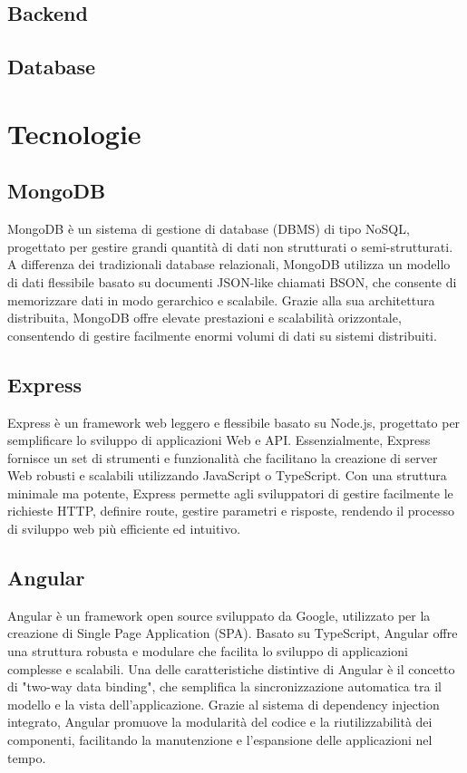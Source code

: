 \documentclass[12pt,a4paper,openright,twoside]{book}
\begin{document}
\section{Backend}

\section{Database}


\chapter{Tecnologie}

\section{MongoDB}

MongoDB è un sistema di gestione di database (DBMS) di tipo NoSQL, progettato per gestire grandi quantità di dati non strutturati o semi-strutturati. A differenza dei tradizionali database relazionali, MongoDB utilizza un modello di dati flessibile basato su documenti JSON-like chiamati BSON, che consente di memorizzare dati in modo gerarchico e scalabile. Grazie alla sua architettura distribuita, MongoDB offre elevate prestazioni e scalabilità orizzontale, consentendo di gestire facilmente enormi volumi di dati su sistemi distribuiti.

\section{Express}

Express è un framework web leggero e flessibile basato su Node.js, progettato per semplificare lo sviluppo di applicazioni Web e API. Essenzialmente, Express fornisce un set di strumenti e funzionalità che facilitano la creazione di server Web robusti e scalabili utilizzando JavaScript o TypeScript. Con una struttura minimale ma potente, Express permette agli sviluppatori di gestire facilmente le richieste HTTP, definire route, gestire parametri e risposte, rendendo il processo di sviluppo web più efficiente ed intuitivo.

\section{Angular}

Angular è un framework open source sviluppato da Google, utilizzato per la creazione di Single Page Application (SPA). Basato su TypeScript, Angular offre una struttura robusta e modulare che facilita lo sviluppo di applicazioni complesse e scalabili. Una delle caratteristiche distintive di Angular è il concetto di "two-way data binding", che semplifica la sincronizzazione automatica tra il modello e la vista dell'applicazione. Grazie al sistema di dependency injection integrato, Angular promuove la modularità del codice e la riutilizzabilità dei componenti, facilitando la manutenzione e l'espansione delle applicazioni nel tempo. 
\end{document}
